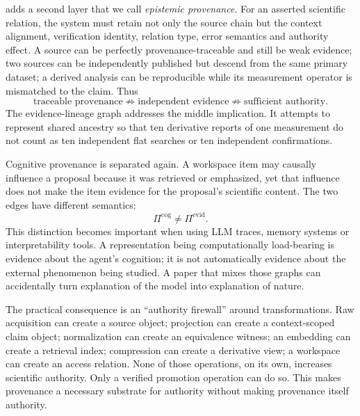 \RAKL{} adds a second layer that we call \emph{epistemic provenance}. For an asserted scientific relation, the system must retain not only the source chain but the context alignment, verification identity, relation type, error semantics and authority effect. A source can be perfectly provenance-traceable and still be weak evidence; two sources can be independently published but descend from the same primary dataset; a derived analysis can be reproducible while its measurement operator is mismatched to the claim. Thus
\[
\text{traceable provenance}\not\Rightarrow
\text{independent evidence}\not\Rightarrow
\text{sufficient authority}.
\]
The evidence-lineage graph addresses the middle implication. It attempts to represent shared ancestry so that ten derivative reports of one measurement do not count as ten independent flat searches or ten independent confirmations.

Cognitive provenance is separated again. A workspace item may causally influence a proposal because it was retrieved or emphasized, yet that influence does not make the item evidence for the proposal's scientific content. The two edges have different semantics:
\[
\Pi^{\mathrm{cog}}\neq \Pi^{\mathrm{evid}}.
\]
This distinction becomes important when using LLM traces, memory systems or interpretability tools. A representation being computationally load-bearing is evidence about the agent's cognition; it is not automatically evidence about the external phenomenon being studied. A paper that mixes those graphs can accidentally turn explanation of the model into explanation of nature.

The practical consequence is an ``authority firewall'' around transformations. Raw acquisition can create a source object; projection can create a context-scoped claim object; normalization can create an equivalence witness; an embedding can create a retrieval index; compression can create a derivative view; a workspace can create an access relation. None of those operations, on its own, increases scientific authority. Only a verified promotion operation can do so. This makes provenance a necessary substrate for authority without making provenance itself authority.


